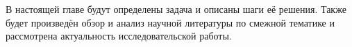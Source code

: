 В настоящей главе будут определены задача и описаны шаги её решения. Также будет произведён обзор и анализ научной литературы по смежной тематике и рассмотрена актуальность исследовательской работы.
